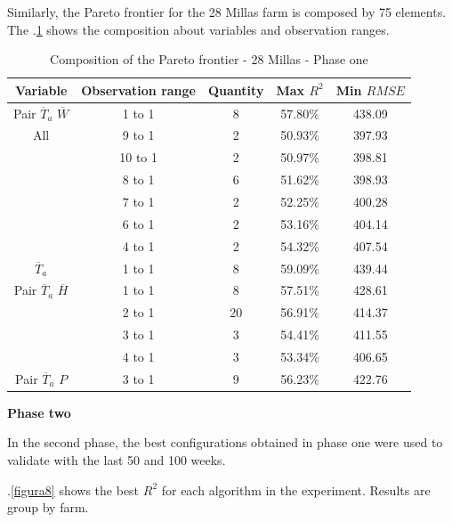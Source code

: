 \documentclass[review]{elsarticle}
\begin{document}
Similarly, the Pareto frontier for the 28 Millas farm is composed by 75 elements. The \tablename $.$\ref{tabla3} shows the composition about variables and observation ranges.

\begin{table}[h] 
\caption{Composition of the Pareto frontier - 28 Millas - Phase one} 
\label{tabla3} 
\centering
\begin{tabular}{c|c|c|c|c} 
\hline
\bfseries Variable & \bfseries Observation range & \bfseries Quantity & \bfseries Max $R^2$ & \bfseries Min $RMSE$\\ 
\hline\hline 
Pair $\overline{T}_{a}$ $\overline{W}$ & 1 to 1 & 8 & 57.80\% & 438.09 \\
\hline 
All   &	9 to 1 & 2 & 50.93\% & 397.93 \\
  & 10 to 1	 & 2 & 50.97\% & 398.81 \\
  &	8 to 1 & 6 & 51.62\% & 398.93 \\
  &	7 to 1 & 2 & 52.25\% & 400.28 \\
  &	6 to 1 & 2 & 53.16\% & 404.14 \\
  &	4 to 1 & 2 & 54.32\% & 407.54 \\
\hline    
$\overline{T}_{a}$ & 1 to 1  & 8  & 59.09\% & 439.44 \\
\hline
Pair $\overline{T}_{a}$ $\overline{H}$ & 1 to 1	 & 8 & 57.51\% & 428.61 \\
 &	2 to 1 & 20 & 56.91\% & 414.37 \\
 &	3 to 1 & 3 & 54.41\% & 411.55 \\
 &	4 to 1 & 3 & 53.34\% & 406.65 \\
\hline
Pair $\overline{T}_{a}$ $P$ & 3 to 1 & 9 & 56.23\% & 422.76 \\
\hline
\end{tabular} 
\end{table}


{\bf Phase two }

In the second phase, the best configurations obtained in phase one were used to validate with the last 50 and 100 weeks. 


\figurename $.$\ref{figura8} shows the best $R^2$ for each algorithm in the experiment. Results are group by farm.
\end{document}

